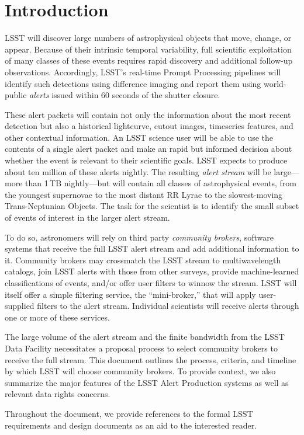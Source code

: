 \section{Introduction}\label{sec:introduction}

LSST will discover large numbers of astrophysical objects that move, change, or appear.
Because of their intrinsic temporal variability, full scientific exploitation of many classes of these events requires rapid discovery and additional follow-up observations.
Accordingly, LSST's real-time Prompt Processing pipelines will identify such detections using difference imaging and report them using world-public \textit{alerts} issued within 60 seconds of the shutter closure.

These alert packets will contain not only the information about the most recent detection but also a historical lightcurve, cutout images, timeseries features, and other contextual information.
An LSST science user will be able to use the contents of a single alert packet and make an rapid but informed decision about whether the event is relevant to their scientific goals.
LSST expects to produce about ten million of these alerts nightly.
The resulting \textit{alert stream} will be large---more than 1\,TB nightly---but will contain all classes of astrophysical events, from the youngest supernovae to the most distant RR Lyrae to the slowest-moving Trans-Neptunian Objects.
The task for the scientist is to identify the small subset of events of interest in the larger alert stream.

To do so, astronomers will rely on third party \textit{community brokers}, software systems that receive the full LSST alert stream and add additional information to it.
Community brokers may crossmatch the LSST stream to multiwavelength catalogs, join LSST alerts with those from other surveys, provide machine-learned classifications of events, and/or offer user filters to winnow the stream.
LSST will itself offer a simple filtering service, the ``mini-broker,'' that will apply user-supplied filters to the alert stream.
Individual scientists will receive alerts through one or more of these services.

The large volume of the alert stream and the finite bandwidth from the LSST Data Facility necessitates a proposal process to select community brokers to receive the full stream.
This document outlines the process, criteria, and timeline by which LSST will choose community brokers.
To provide context, we also summarize the major features of the LSST Alert Production systems as well as relevant data rights concerns.

Throughout the document, we provide references to the formal LSST requirements and design documents as an aid to the interested reader.
